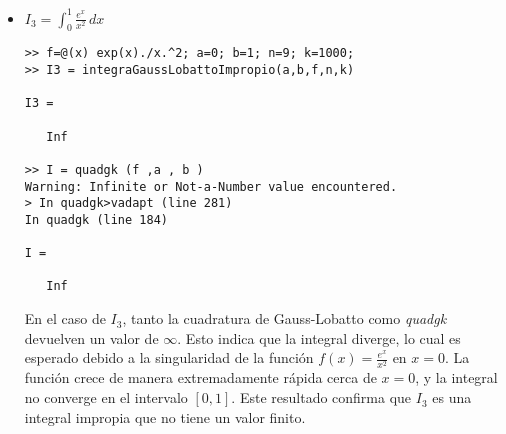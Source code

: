 \documentclass[a4paper]{article}
\begin{document}
\begin{itemize}
    \item $\displaystyle I_3=\int_{0}^{1} \! \frac{e^x}{x^2}  \,dx$
\\
\begin{lstlisting}[frame=single, style=Matlab-Pyglike]
>> f=@(x) exp(x)./x.^2; a=0; b=1; n=9; k=1000;
>> I3 = integraGaussLobattoImpropio(a,b,f,n,k)

I3 =

   Inf

>> I = quadgk (f ,a , b )
Warning: Infinite or Not-a-Number value encountered. 
> In quadgk>vadapt (line 281)
In quadgk (line 184) 

I =

   Inf
\end{lstlisting}

En el caso de \( I_3 \), tanto la cuadratura de Gauss-Lobatto como \textit{quadgk} devuelven un valor de \( \infty \). Esto indica que la integral diverge, lo cual es esperado debido a la singularidad de la función \( f(x) = \frac{e^x}{x^2} \) en \( x = 0 \). La función crece de manera extremadamente rápida cerca de \( x = 0 \), y la integral no converge en el intervalo \( [0, 1] \). Este resultado confirma que \( I_3 \) es una integral impropia que no tiene un valor finito.
    
\end{itemize}
\end{document}
